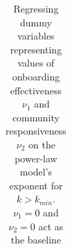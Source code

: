 \documentclass{nws}
\begin{document}
\begin{table}[h]
\centering
\caption{Regressing dummy variables representing values of onboarding effectiveness $\nu_1$ and community responsiveness $\nu_2$ on the power-law model's exponent for $k>k_{min}$. $\nu_1 = 0$ and $\nu_2 = 0$ act as the baseline}
\label{table:regression exponent}
\begin{tabular}{|l|r|r|r|r|} 

\end{tabular}
\end{table}
\end{document}
